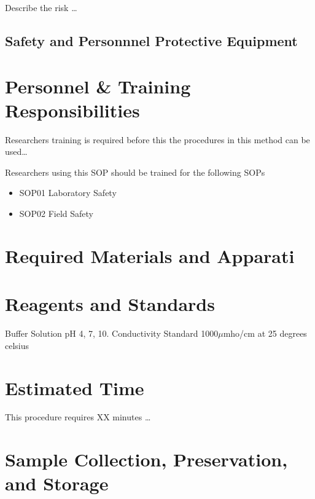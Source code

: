 \documentclass[12pt]{../SOP3}\usepackage[]{graphicx}\usepackage[]{color}
\begin{document}
\NP Describe the risk \dots


\subsection{Safety and Personnnel Protective Equipment}


\section{Personnel \& Training Responsibilities}

\NP Researchers training is required before this the procedures in this method can be used\dots 

\NP Researchers using this SOP should be trained for the following SOPs

\begin{itemize}
  \item SOP01 Laboratory Safety
  \item SOP02 Field Safety
\end{itemize}

\section{Required Materials and Apparati}


\section{Reagents and Standards}

\NP Buffer Solution pH 4, 7, 10. 
\NP Conductivity Standard 1000$\mu$mho/cm at 25 degrees celsius 

\section{Estimated Time}

\NP This procedure requires XX minutes \dots

\section{Sample Collection, Preservation, and Storage}
\end{document}
